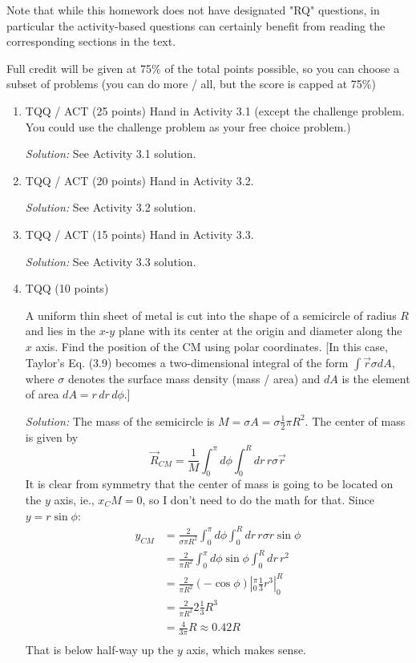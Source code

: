 \documentclass[12pt]{article}
\newcommand{\soln}[1] {\textit{Solution:} #1}
\begin{document}
Note that while this homework does not have designated "RQ" questions, in particular the activity-based questions can certainly benefit from reading the corresponding sections in the text.

Full credit will be given at 75\% of the total points possible, so you can choose a subset of problems (you can do more / all, but the score is capped at 75\%)

\begin{enumerate}
    \item TQQ / ACT (25 points) Hand in Activity 3.1 (except the challenge problem. You could use the challenge problem as your free choice problem.)

          \soln{See Activity 3.1 solution.}

    \item TQQ / ACT (20 points) Hand in Activity 3.2.

          \soln{See Activity 3.2 solution.}
    \item TQQ / ACT (15 points) Hand in Activity 3.3.

          \soln{See Activity 3.3 solution.}
    \item TQQ (10 points)

          A uniform thin sheet of metal is cut into the shape of a semicircle of radius $R$ and lies in the $x$-$y$ plane with its center at the origin and diameter along the $x$ axis. Find the position of the CM using polar coordinates. [In this case, Taylor's Eq. (3.9) becomes a two-dimensional integral of the form $\int \vec r \sigma dA$, where $\sigma$ denotes the surface mass density (mass / area) and $dA$ is the element of area $dA = r\,dr\,d\phi$.]

          \soln{The mass of the semicircle is $M = \sigma A = \sigma \frac{1}{2}\pi R^2$. The center of mass is given by
              $$
                  \vec R_{CM} = \frac{1}{M} \int_0^\pi d\phi \int_0^R dr \, r\sigma \vec r
              $$
              It is clear from symmetry that the center of mass is going to be located on the $y$ axis, ie., $x_CM = 0$, so I don't need to do the math for that. Since $y = r\sin\phi$:
              \begin{align*}
                  y_{CM} & = \frac{2}{\sigma \pi R^2} \int_0^\pi d\phi \int_0^R dr \, r\sigma r \sin\phi \\
                         & =\frac{2}{\pi R^2} \int_0^\pi d\phi \sin\phi \int_0^R dr\,r^2                 \\
                         & = \frac{2}{\pi R^2} (-\cos\phi)|_0^\pi \frac{1}{3}r^3|_0^R                    \\
                         & = \frac{2}{\pi R^2} 2 \frac{1}{3}R^3                                          \\
                         & = \frac{4}{3\pi}R \approx 0.42 R                                              \\
              \end{align*}
              That is below half-way up the $y$ axis, which makes sense.
          }



\end{enumerate}
\end{document}
